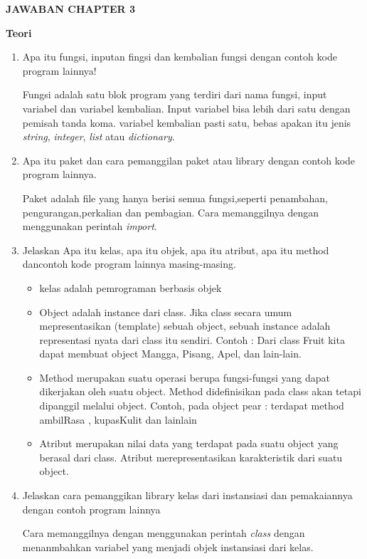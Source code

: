 \item \textbf{JAWABAN CHAPTER 3} 
\par
\textbf{Teori}
\begin{enumerate}
    \item Apa itu fungsi, inputan fingsi dan kembalian fungsi dengan contoh kode program lainnya!
    \par Fungsi adalah satu blok program yang terdiri dari nama fungsi, input variabel dan variabel kembalian. Input variabel bisa lebih dari satu dengan pemisah tanda koma. variabel kembalian pasti satu, bebas apakan itu jenis \textit{string}, \textit{integer}, \textit{list} atau \textit{dictionary}.
    
    \item   Apa  itu  paket  dan  cara  pemanggilan  paket  atau  library  dengan  contoh  kode program lainnya.
    \par Paket adalah file yang hanya berisi semua fungsi,seperti penambahan, pengurangan,perkalian  dan  pembagian. Cara memanggilnya dengan menggunakan perintah \textit{import}.
    
    \item Jelaskan  Apa  itu  kelas,  apa  itu  objek,  apa  itu  atribut,  apa  itu  method  dancontoh kode program lainnya masing-masing.
    \begin{itemize}
        \item kelas adalah pemrograman berbasis objek
        \item Object adalah instance dari class. Jika class secara umum mepresentasikan (template) sebuah object, sebuah instance adalah representasi nyata dari class itu sendiri. Contoh : Dari class Fruit kita dapat membuat object Mangga, Pisang, Apel, dan lain-lain.
        \item Method merupakan suatu operasi berupa fungsi-fungsi yang dapat dikerjakan oleh suatu object. Method didefinisikan pada class akan tetapi dipanggil melalui object. Contoh, pada object pear : terdapat method ambilRasa , kupasKulit dan lainlain
        \item Atribut merupakan nilai data yang terdapat pada suatu object yang berasal dari class. Atribut merepresentasikan karakteristik dari suatu object. 
    \end{itemize}
    
    \item Jelaskan cara pemanggikan library kelas dari instansiasi dan pemakaiannya dengan contoh program lainnya
    \par Cara memanggilnya dengan menggunakan perintah \textit{class} dengan menanmbahkan variabel yang menjadi objek instansiasi dari kelas.
    

\end{enumerate}
